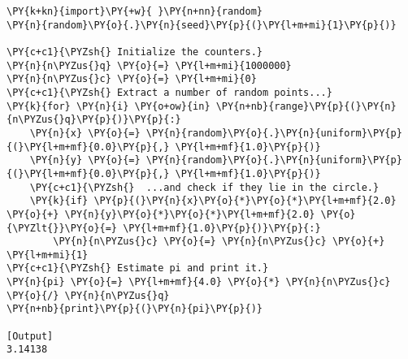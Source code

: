 \begin{Verbatim}[label=\makebox{\href{https://github.com/unipi-physics-labs/statnotes/tree/main/snippy/mc_pi.py}{https://github.com/.../mc\_pi.py}},commandchars=\\\{\}]
\PY{k+kn}{import}\PY{+w}{ }\PY{n+nn}{random}
\PY{n}{random}\PY{o}{.}\PY{n}{seed}\PY{p}{(}\PY{l+m+mi}{1}\PY{p}{)}

\PY{c+c1}{\PYZsh{} Initialize the counters.}
\PY{n}{n\PYZus{}q} \PY{o}{=} \PY{l+m+mi}{1000000}
\PY{n}{n\PYZus{}c} \PY{o}{=} \PY{l+m+mi}{0}
\PY{c+c1}{\PYZsh{} Extract a number of random points...}
\PY{k}{for} \PY{n}{i} \PY{o+ow}{in} \PY{n+nb}{range}\PY{p}{(}\PY{n}{n\PYZus{}q}\PY{p}{)}\PY{p}{:}
    \PY{n}{x} \PY{o}{=} \PY{n}{random}\PY{o}{.}\PY{n}{uniform}\PY{p}{(}\PY{l+m+mf}{0.0}\PY{p}{,} \PY{l+m+mf}{1.0}\PY{p}{)}
    \PY{n}{y} \PY{o}{=} \PY{n}{random}\PY{o}{.}\PY{n}{uniform}\PY{p}{(}\PY{l+m+mf}{0.0}\PY{p}{,} \PY{l+m+mf}{1.0}\PY{p}{)}
    \PY{c+c1}{\PYZsh{}  ...and check if they lie in the circle.}
    \PY{k}{if} \PY{p}{(}\PY{n}{x}\PY{o}{*}\PY{o}{*}\PY{l+m+mf}{2.0} \PY{o}{+} \PY{n}{y}\PY{o}{*}\PY{o}{*}\PY{l+m+mf}{2.0} \PY{o}{\PYZlt{}}\PY{o}{=} \PY{l+m+mf}{1.0}\PY{p}{)}\PY{p}{:}
        \PY{n}{n\PYZus{}c} \PY{o}{=} \PY{n}{n\PYZus{}c} \PY{o}{+} \PY{l+m+mi}{1}
\PY{c+c1}{\PYZsh{} Estimate pi and print it.}
\PY{n}{pi} \PY{o}{=} \PY{l+m+mf}{4.0} \PY{o}{*} \PY{n}{n\PYZus{}c} \PY{o}{/} \PY{n}{n\PYZus{}q}
\PY{n+nb}{print}\PY{p}{(}\PY{n}{pi}\PY{p}{)}

[Output]
3.14138
\end{Verbatim}
